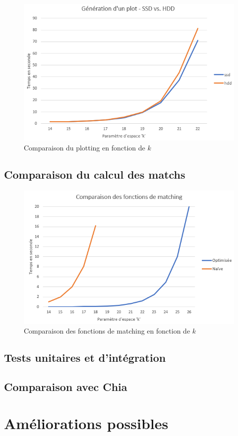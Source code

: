 \begin{figure}[H]
  \centering
  \includegraphics[width=13cm]{images/bench_ssd_hdd.png}
  \caption{Comparaison du plotting en fonction de $k$}
\end{figure}

\subsection{Comparaison du calcul des matchs}

\begin{figure}[H]
  \centering
  \includegraphics[width=14cm]{images/bench_matching.png}
  \caption{Comparaison des fonctions de matching en fonction de $k$}
\end{figure}

\subsection{Tests unitaires et d'intégration}

\subsection{Comparaison avec Chia}

\section{Améliorations possibles}

\lipsum[1]